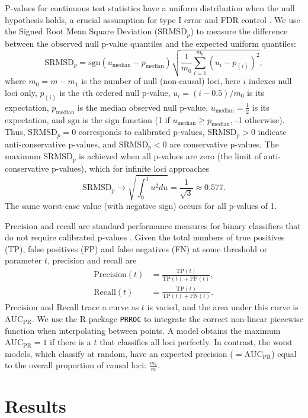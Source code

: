 \documentclass[11pt]{article}
\newcommand{\rmsd}{\text{SRMSD}_p}
\newcommand{\auc}{\text{AUC}_\text{PR}}
\begin{document}
P-values for continuous test statistics have a uniform distribution when the null hypothesis holds, a crucial assumption for type I error and FDR control \citep{storey_positive_2003, storey_statistical_2003}.
We use the Signed Root Mean Square Deviation ($\rmsd$) to measure the difference between the observed null p-value quantiles and the expected uniform quantiles:
$$
\rmsd
=
\text{sgn}(u_\text{median} - p_\text{median} ) \sqrt{ \frac{1}{m_0} \sum_{i = 1}^{m_0} \left( u_i - p_{(i)} \right)^2 },
$$
where
$m_0 = m - m_1$ is the number of null (non-causal) loci,
here $i$ indexes null loci only,
$p_{(i)}$ is the $i$th ordered null p-value,
$u_i = ( i - 0.5 ) / m_0$ is its expectation,
$p_\text{median}$ is the median observed null p-value,
$u_\text{median} = \frac{1}{2}$ is its expectation,
and $\text{sgn}$ is the sign function (1 if $u_\text{median} \ge p_\text{median}$, -1 otherwise).
Thus, $\rmsd = 0$ corresponds to calibrated p-values, $\rmsd > 0$ indicate anti-conservative p-values, and $\rmsd < 0$ are conservative p-values.
The maximum $\rmsd$ is achieved when all p-values are zero (the limit of anti-conservative p-values), which for infinite loci approaches
$$
\rmsd
\rightarrow
\sqrt{ \int_0^1 u^2 du }
=
\frac{1}{ \sqrt{ 3 } }
\approx
0.577
.
$$
The same worst-case value (with negative sign) occurs for all p-values of 1.

Precision and recall are standard performance measures for binary classifiers that do not require calibrated p-values \citep{grau_prroc:_2015}.
Given the total numbers of true positives (TP), false positives (FP) and false negatives (FN) at some threshold or parameter $t$, precision and recall are
\begin{align*}
  \text{Precision}(t)
  &=
    \frac{ \text{TP}(t) }{ \text{TP}(t) + \text{FP}(t) }
    , \\
  \text{Recall}(t)
  &=
    \frac{ \text{TP}(t) }{ \text{TP}(t) + \text{FN}(t) }
    .
\end{align*}
Precision and Recall trace a curve as $t$ is varied, and the area under this curve is $\auc$.
We use the R package \texttt{PRROC} to integrate the correct non-linear piecewise function when interpolating between points.
A model obtains the maximum $\auc = 1$ if there is a $t$ that classifies all loci perfectly.
In contrast, the worst models, which classify at random, have an expected precision ($= \auc$) equal to the overall proportion of causal loci:
$\frac{m_1}{m}$.


\section{Results}
\end{document}
